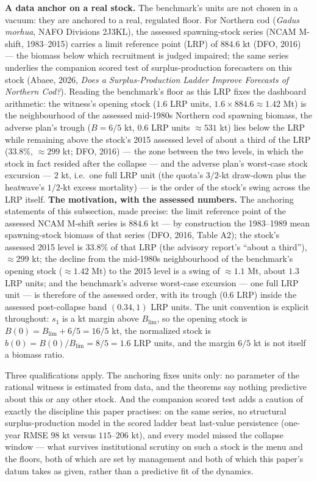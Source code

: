 \documentclass[3p,11pt]{elsarticle}
\begin{document}
\textbf{A data anchor on a real stock.} The benchmark's units are not chosen in a
vacuum: they are anchored to a real, regulated floor. For Northern cod
(\emph{Gadus morhua}, NAFO Divisions 2J3KL), the assessed spawning-stock
series (NCAM M-shift, 1983--2015) carries a limit reference point (LRP) of
\(884.6\) kt (DFO, 2016) --- the biomass below which recruitment is judged
impaired; the same series underlies the companion scored test of
surplus-production forecasters on this stock (Abaee, 2026, \emph{Does a
Surplus-Production Ladder Improve Forecasts of Northern Cod?}). Reading the
benchmark's floor as this LRP fixes the dashboard arithmetic: the witness's
opening stock (\(1.6\) LRP units, \(1.6 \times 884.6 \approx 1.42\) Mt) is the
neighbourhood of the assessed mid-1980s Northern cod spawning biomass, the
adverse plan's trough (\(B = 6/5\) kt, \(0.6\) LRP units \(\approx 531\)
kt) lies below the LRP while remaining above the stock's 2015
assessed level of about a third of the LRP (\(33.8\%\), \(\approx 299\)
kt; DFO, 2016) --- the zone between the two levels, in which the stock in fact
resided after the collapse --- and the adverse plan's
worst-case stock excursion --- \(2\) kt, i.e.\ one full LRP unit (the
quota's \(3/2\)-kt draw-down plus the heatwave's \(1/2\)-kt excess
mortality) --- is the order of the stock's swing across the LRP itself.
\textbf{The motivation, with the assessed numbers.} The anchoring
statements of this subsection, made precise: the limit reference point of
the assessed NCAM M-shift series is \(884.6\) kt --- by construction the
1983--1989 mean spawning-stock biomass of that series (DFO, 2016, Table
A2); the stock's assessed 2015 level is \(33.8\%\) of that LRP (the
advisory report's ``about a third''), \(\approx 299\) kt; the decline
from the mid-1980s neighbourhood of the benchmark's opening stock
(\(\approx 1.42\) Mt) to the 2015 level is a swing of \(\approx 1.1\)
Mt, about \(1.3\) LRP units; and the benchmark's adverse worst-case
excursion --- one full LRP unit --- is therefore of the assessed order,
with its trough (\(0.6\) LRP) inside the assessed post-collapse band
\((0.34, 1)\) LRP units. The unit convention is explicit throughout:
\(s_1\) is a kt margin above \(B_{\mathrm{lim}}\), so the opening
stock is \(B(0) = B_{\mathrm{lim}} + 6/5 = 16/5\) kt, the normalized
stock is \(b(0) = B(0)/B_{\mathrm{lim}} = 8/5 = 1.6\) LRP units, and the
margin \(6/5\) kt is not itself a biomass ratio.

Three qualifications apply. The anchoring fixes units only: no
parameter of the rational witness is estimated from data, and the
theorems say nothing predictive about this or any other stock. And the companion scored test adds a caution of exactly the
discipline this paper practises: on the same series, no structural
surplus-production model in the scored ladder beat last-value persistence
(one-year RMSE \(98\) kt versus \(115\)--\(206\) kt), and every model missed
the collapse window --- what survives institutional scrutiny on such a stock
is the menu and the floors, both of which are set by management and both of
which this paper's datum takes as given, rather than a predictive fit of the
dynamics.
\end{document}
